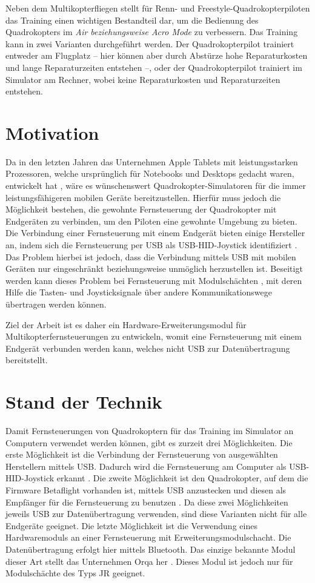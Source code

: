 Neben dem Multikopterfliegen stellt für Renn- und Freestyle-Quadrokopterpiloten das Training einen wichtigen Bestandteil dar, um die Bedienung des Quadrokopters im \textit{Air beziehungsweise Acro Mode} zu verbessern. Das Training kann in zwei Varianten durchgeführt werden. Der Quadrokopterpilot trainiert entweder am Flugplatz -- hier können aber durch Abstürze hohe Reparaturkosten und lange Reparaturzeiten entstehen --, oder der Quadrokopterpilot trainiert im Simulator am Rechner, wobei keine Reparaturkosten und Reparaturzeiten entstehen.

\section{Motivation}

Da in den letzten Jahren das Unternehmen Apple Tablets mit leistungsstarken Prozessoren, welche ursprünglich für Notebooks und Desktops gedacht waren, entwickelt hat \cite{appleM2IPad}, wäre es wünschenswert Quadrokopter-Simulatoren für die immer leistungsfähigeren mobilen Geräte bereitzustellen. Hierfür muss jedoch die Möglichkeit bestehen, die gewohnte Fernsteuerung der Quadrokopter mit Endgeräten zu verbinden, um den Piloten eine gewohnte Umgebung zu bieten. Die Verbindung einer Fernsteuerung mit einem Endgerät bieten einige Hersteller an, indem sich die Fernsteuerung per \acs{USB} als \acs{USB}-\acs{HID}-Joystick identifiziert \cite{opentxJoystick}. Das Problem hierbei ist jedoch, dass die Verbindung mittels \acs{USB} mit mobilen Geräten nur eingeschränkt beziehungsweise unmöglich herzustellen ist. Beseitigt werden kann dieses Problem bei Fernsteuerung mit Modulschächten \cite{opentxModulbay}, mit deren Hilfe  die Tasten- und Joysticksignale über andere Kommunikationswege übertragen werden können.

Ziel der Arbeit ist es daher ein Hardware-Erweiterungsmodul für Multikopterfernsteuerungen zu entwickeln, womit eine Fernsteuerung mit einem Endgerät verbunden werden kann, welches nicht \acs{USB} zur Datenübertragung bereitstellt.

\section{Stand der Technik}

Damit Fernsteuerungen von Quadrokoptern für das Training im Simulator an Computern verwendet werden können, gibt es zurzeit drei Möglichkeiten. Die erste Möglichkeit ist die Verbindung der Fernsteuerung von ausgewählten Herstellern mittels \acs{USB}. Dadurch wird die Fernsteuerung am Computer als \acs{USB}-\acs{HID}-Joystick erkannt \cite{opentxJoystick}. Die zweite Möglichkeit ist den Quadrokopter, auf dem die Firmware Betaflight vorhanden ist, mittels \acs{USB} anzustecken und diesen als Empfänger für die Fernsteuerung zu benutzen \cite{betaflightHID}. Da diese zwei Möglichkeiten jeweils \acs{USB} zur Datenübertragung verwenden, sind diese Varianten nicht für alle Endgeräte geeignet. Die letzte Möglichkeit ist die Verwendung eines Hardwaremoduls an einer Fernsteuerung mit Erweiterungsmodulschacht. Die Datenübertragung erfolgt hier mittels Bluetooth. Das einzige bekannte Modul dieser Art stellt das Unternehmen Orqa her \cite{orqaBluetoothModule}. Dieses Modul ist jedoch nur für Modulschächte des Typs JR geeignet.
